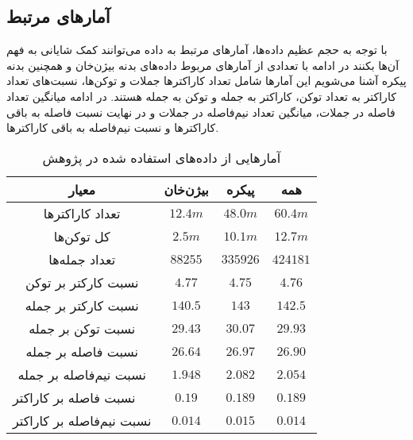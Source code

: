 \subsection{آمار‌های مرتبط}
\hspace{30pt}
با توجه به حجم عظیم داده‌ها، آمار‌های مرتبط به داده می‌توانند کمک شایانی به فهم آن‌ها بکنند در ادامه با تعدادی از آمار‌های مربوط داده‌های بدنه بیژن‌خان و همچنین بدنه پیکره آشنا می‌شویم این آمار‌ها شامل تعداد کاراکترها جملات و توکن‌ها، نسبت‌های تعداد کاراکتر به تعداد توکن، کاراکتر به جمله و توکن به جمله هستند. در ادامه میانگین تعداد فاصله در جملات، میانگین تعداد نیم‌فاصله در جملات و در نهایت نسبت فاصله به باقی کاراکترها و نسبت نیم‌فاصله به باقی کاراکترها.
\begin{table}[H]
    \centering
     \caption{آمار‌هایی از داده‌های استفاده‌ شده در پژوهش}
    \label{tab:data_statistics}
\begin{tabular}{|c|c|c|c|}
\hline
\textbf{معیار}                                  & \textbf{بیژن‌خان} & \textbf{پیکره} & \textbf{همه} \\ \hline
تعداد کاراکتر‌ها                                & \(12.4m\)         & \(48.0m\)      & \(60.4m\)    \\ \hline
کل توکن‌ها                                      & \(2.5m\)          & \(10.1m\)      & \(12.7m\)    \\ \hline
تعداد جمله‌ها                                   & \(88255\)         & \(335926\)     & \(424181\)   \\ \hline
نسبت کارکتر بر توکن                             & \(4.77\)          & \(4.75\)       & \(4.76\)     \\ \hline
نسبت کارکتر بر جمله                             & \(140.5\)         & \(143\)        & \(142.5\)    \\ \hline
نسبت توکن بر جمله                               & \(29.43\)         & \(30.07\)      & \(29.93\)    \\ \hline
نسبت فاصله بر جمله                              & \(26.64\)         & \(26.97\)      & \(26.90\)    \\ \hline
نسبت نیم‌فاصله بر جمله                          & \(1.948\)         & \(2.082\)      & \(2.054\)    \\ \hline
\multicolumn{1}{|l|}{نسبت فاصله بر کاراکتر}     & \(0.19\)          & \(0.189\)      & \(0.189\)    \\ \hline
\multicolumn{1}{|l|}{نسبت نیم‌فاصله بر کاراکتر} & \(0.014\)         & \(0.015\)      & \(0.014\)    \\ \hline
\end{tabular}

\end{table}

